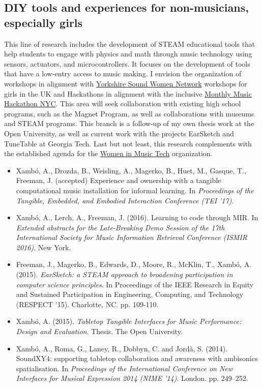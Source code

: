 \documentclass[10pt, a4paper]{article}
\begin{document}
\subsection*{DIY tools and experiences for non-musicians, especially girls}

This line of research includes the development of STEAM educational tools that help students to engage with physics and math through music technology using sensors, actuators, and microcontrollers. It focuses on the development of tools that have a low-entry access to music making. I envision the organization of workshops in alignment with \href{https://yorkshiresoundwomen.wordpress.com}{Yorkshire Sound Women Network} workshops for girls in the UK and Hackathons in alignment with the inclusive \href{monthlymusichackathon.org}{Monthly Music Hackathon NYC}. This area will seek collaboration with existing high school programs, such as the Magnet Program, as well as collaborations with museums and STEAM programs. This branch is a follow-up of my own thesis work at the Open University, as well as current work with the projects EarSketch and TuneTable at Georgia Tech. Last but not least, this research complements with the established agenda for the \href{http://gtcmt.gatech.edu/womeninmusictech}{Women in Music Tech} organization.

\begin{itemize}
\item Xambó, A., Drozda, B., Weisling, A., Magerko, B., Huet, M., Gasque, T., Freeman, J. (accepted) Experience and ownership with a tangible computational music installation for informal learning. In \emph{Proceedings of the Tangible, Embedded, and Embodied Interaction Conference (TEI '17)}.
\item Xambó, A., Lerch, A., Freeman, J. (2016). Learning to code through MIR. In \emph{Extended abstracts for the Late-Breaking Demo Session of the 17th International Society for Music Information Retrieval Conference (ISMIR 2016)}. New York.
\item Freeman, J., Magerko, B., Edwards, D., Moore, R., McKlin, T., Xambó, A. (2015). \emph{EarSketch: a STEAM approach to broadening participation in computer science principles}. In Proceedings of the IEEE Research in Equity and Sustained Participation in Engineering, Computing, and Technology (RESPECT '15). Charlotte, NC. pp. 109-110.
\item Xambó, A. (2015). \emph{Tabletop Tangible Interfaces for Music Performance: Design and Evaluation}. Thesis. The Open University.
\item Xambó, A., Roma, G., Laney, R., Dobbyn, C. and Jordà, S. (2014). SoundXY4: supporting tabletop collaboration and awareness with ambisonics spatialisation. In \emph{Proceedings of the International Conference on New Interfaces for Musical Expression 2014 (NIME '14)}. London. pp. 249–252.
\end{itemize}
\end{document}
